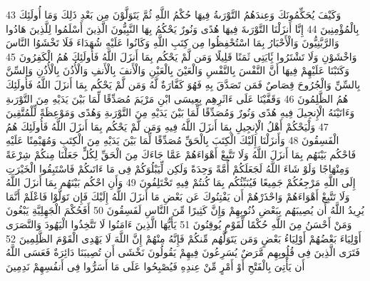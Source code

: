 {\tiny\colorbox{cl_aya}{43}} وَكَيْفَ يُحَكِّمُونَكَ وَعِندَهُمُ التَّوْرَىةُ فِيهَا حُكْمُ اللَّهِ ثُمَّ يَتَوَلَّوْنَ مِن بَعْدِ ذَلِكَ وَمَا أُولَئِكَ بِالْمُؤْمِنِينَ
{\tiny\colorbox{cl_aya}{44}} إِنَّا أَنزَلْنَا التَّوْرَىةَ فِيهَا هُدًى وَنُورٌ يَحْكُمُ بِهَا النَّبِيُّونَ الَّذِينَ أَسْلَمُوا لِلَّذِينَ هَادُوا وَالرَّبَّنِيُّونَ وَالْأَحْبَارُ بِمَا اسْتُحْفِظُوا مِن كِتَبِ اللَّهِ وَكَانُوا عَلَيْهِ شُهَدَاءَ فَلَا تَخْشَوُا النَّاسَ وَاخْشَوْنِ وَلَا تَشْتَرُوا بَِٔايَتِى ثَمَنًا قَلِيلًا وَمَن لَّمْ يَحْكُم بِمَا أَنزَلَ اللَّهُ فَأُولَئِكَ هُمُ الْكَفِرُونَ
{\tiny\colorbox{cl_aya}{45}} وَكَتَبْنَا عَلَيْهِمْ فِيهَا أَنَّ النَّفْسَ بِالنَّفْسِ وَالْعَيْنَ بِالْعَيْنِ وَالْأَنفَ بِالْأَنفِ وَالْأُذُنَ بِالْأُذُنِ وَالسِّنَّ بِالسِّنِّ وَالْجُرُوحَ قِصَاصٌ فَمَن تَصَدَّقَ بِهِ فَهُوَ كَفَّارَةٌ لَّهُ وَمَن لَّمْ يَحْكُم بِمَا أَنزَلَ اللَّهُ فَأُولَئِكَ هُمُ الظَّلِمُونَ
{\tiny\colorbox{cl_aya}{46}} وَقَفَّيْنَا عَلَى ءَاثَرِهِم بِعِيسَى ابْنِ مَرْيَمَ مُصَدِّقًا لِّمَا بَيْنَ يَدَيْهِ مِنَ التَّوْرَىةِ وَءَاتَيْنَهُ الْإِنجِيلَ فِيهِ هُدًى وَنُورٌ وَمُصَدِّقًا لِّمَا بَيْنَ يَدَيْهِ مِنَ التَّوْرَىةِ وَهُدًى وَمَوْعِظَةً لِّلْمُتَّقِينَ
{\tiny\colorbox{cl_aya}{47}} وَلْيَحْكُمْ أَهْلُ الْإِنجِيلِ بِمَا أَنزَلَ اللَّهُ فِيهِ وَمَن لَّمْ يَحْكُم بِمَا أَنزَلَ اللَّهُ فَأُولَئِكَ هُمُ الْفَسِقُونَ
{\tiny\colorbox{cl_aya}{48}} وَأَنزَلْنَا إِلَيْكَ الْكِتَبَ بِالْحَقِّ مُصَدِّقًا لِّمَا بَيْنَ يَدَيْهِ مِنَ الْكِتَبِ وَمُهَيْمِنًا عَلَيْهِ فَاحْكُم بَيْنَهُم بِمَا أَنزَلَ اللَّهُ وَلَا تَتَّبِعْ أَهْوَاءَهُمْ عَمَّا جَاءَكَ مِنَ الْحَقِّ لِكُلٍّ جَعَلْنَا مِنكُمْ شِرْعَةً وَمِنْهَاجًا وَلَوْ شَاءَ اللَّهُ لَجَعَلَكُمْ أُمَّةً وَحِدَةً وَلَكِن لِّيَبْلُوَكُمْ فِى مَا ءَاتَىكُمْ فَاسْتَبِقُوا الْخَيْرَتِ إِلَى اللَّهِ مَرْجِعُكُمْ جَمِيعًا فَيُنَبِّئُكُم بِمَا كُنتُمْ فِيهِ تَخْتَلِفُونَ
{\tiny\colorbox{cl_aya}{49}} وَأَنِ احْكُم بَيْنَهُم بِمَا أَنزَلَ اللَّهُ وَلَا تَتَّبِعْ أَهْوَاءَهُمْ وَاحْذَرْهُمْ أَن يَفْتِنُوكَ عَن بَعْضِ مَا أَنزَلَ اللَّهُ إِلَيْكَ فَإِن تَوَلَّوْا فَاعْلَمْ أَنَّمَا يُرِيدُ اللَّهُ أَن يُصِيبَهُم بِبَعْضِ ذُنُوبِهِمْ وَإِنَّ كَثِيرًا مِّنَ النَّاسِ لَفَسِقُونَ
{\tiny\colorbox{cl_aya}{50}} أَفَحُكْمَ الْجَهِلِيَّةِ يَبْغُونَ وَمَنْ أَحْسَنُ مِنَ اللَّهِ حُكْمًا لِّقَوْمٍ يُوقِنُونَ
{\tiny\colorbox{cl_aya}{51}} يَأَيُّهَا الَّذِينَ ءَامَنُوا لَا تَتَّخِذُوا الْيَهُودَ وَالنَّصَرَى أَوْلِيَاءَ بَعْضُهُمْ أَوْلِيَاءُ بَعْضٍ وَمَن يَتَوَلَّهُم مِّنكُمْ فَإِنَّهُ مِنْهُمْ إِنَّ اللَّهَ لَا يَهْدِى الْقَوْمَ الظَّلِمِينَ
{\tiny\colorbox{cl_aya}{52}} فَتَرَى الَّذِينَ فِى قُلُوبِهِم مَّرَضٌ يُسَرِعُونَ فِيهِمْ يَقُولُونَ نَخْشَى أَن تُصِيبَنَا دَائِرَةٌ فَعَسَى اللَّهُ أَن يَأْتِىَ بِالْفَتْحِ أَوْ أَمْرٍ مِّنْ عِندِهِ فَيُصْبِحُوا عَلَى مَا أَسَرُّوا فِى أَنفُسِهِمْ نَدِمِينَ
